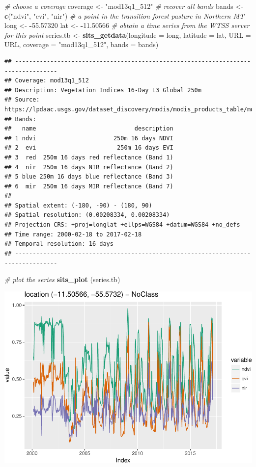 \documentclass[11pt,]{article}
\newenvironment{Shaded}{\begin{snugshade}}{\end{snugshade}}
\newcommand{\KeywordTok}[1]{\textcolor[rgb]{0.13,0.29,0.53}{\textbf{#1}}}
\newcommand{\DataTypeTok}[1]{\textcolor[rgb]{0.13,0.29,0.53}{#1}}
\newcommand{\FloatTok}[1]{\textcolor[rgb]{0.00,0.00,0.81}{#1}}
\newcommand{\StringTok}[1]{\textcolor[rgb]{0.31,0.60,0.02}{#1}}
\newcommand{\CommentTok}[1]{\textcolor[rgb]{0.56,0.35,0.01}{\textit{#1}}}
\newcommand{\OperatorTok}[1]{\textcolor[rgb]{0.81,0.36,0.00}{\textbf{#1}}}
\newcommand{\NormalTok}[1]{#1}
\begin{document}
\begin{Shaded}
\begin{Highlighting}[]
\CommentTok{# choose a coverage}
\NormalTok{coverage <-}\StringTok{ "mod13q1_512"}
\CommentTok{# recover all bands}
\NormalTok{bands <-}\StringTok{ }\KeywordTok{c}\NormalTok{(}\StringTok{"ndvi"}\NormalTok{, }\StringTok{"evi"}\NormalTok{, }\StringTok{"nir"}\NormalTok{)}
\CommentTok{# a point in the transition forest pasture in Northern MT}
\NormalTok{long <-}\StringTok{ }\OperatorTok{-}\FloatTok{55.57320}
\NormalTok{lat <-}\StringTok{ }\OperatorTok{-}\FloatTok{11.50566}
\CommentTok{# obtain a time series from the WTSS server for this point}
\NormalTok{series.tb <-}\StringTok{ }\KeywordTok{sits_getdata}\NormalTok{(}\DataTypeTok{longitude =}\NormalTok{ long, }\DataTypeTok{latitude =}\NormalTok{ lat, }\DataTypeTok{URL =}\NormalTok{ URL, }\DataTypeTok{coverage =} \StringTok{"mod13q1_512"}\NormalTok{, }\DataTypeTok{bands =}\NormalTok{ bands)}
\end{Highlighting}
\end{Shaded}

\begin{verbatim}
## ----------------------------------------------------------------------------------
## Coverage: mod13q1_512
## Description: Vegetation Indices 16-Day L3 Global 250m
## Source: https://lpdaac.usgs.gov/dataset_discovery/modis/modis_products_table/mod13q1
## Bands: 
##   name                            description
## 1 ndvi                      250m 16 days NDVI
## 2  evi                       250m 16 days EVI
## 3  red  250m 16 days red reflectance (Band 1)
## 4  nir  250m 16 days NIR reflectance (Band 2)
## 5 blue 250m 16 days blue reflectance (Band 3)
## 6  mir  250m 16 days MIR reflectance (Band 7)
## 
## Spatial extent: (-180, -90) - (180, 90)
## Spatial resolution: (0.00208334, 0.00208334)
## Projection CRS: +proj=longlat +ellps=WGS84 +datum=WGS84 +no_defs
## Time range: 2000-02-18 to 2017-02-18
## Temporal resolution: 16 days 
## ----------------------------------------------------------------------------------
\end{verbatim}

\begin{Shaded}
\begin{Highlighting}[]
\CommentTok{# plot the series}
\KeywordTok{sits_plot}\NormalTok{ (series.tb)}
\end{Highlighting}
\end{Shaded}

\includegraphics{sits_description_files/figure-latex/unnamed-chunk-13-1.pdf}
\newpage
\singlespacing

\end{document}
